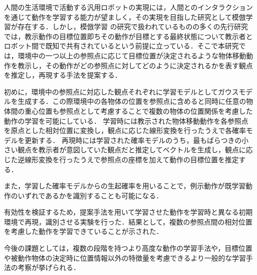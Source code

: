 ﻿人間の生活環境で活動する汎用ロボットの実現には，人間とのインタラクションを通じて動作を学習する能力が望ましく，その実現を目指した研究として模倣学習が存在する．しかし，模倣学習
の研究で扱われているものの多くの先行研究では，教示動作の目標位置即ちその動作が目標とする最終状態について教示者とロボット間で既知で共有されているという前提に立っている．そこで本研究では，環境中の一つ以上の参照点に応じて目標位置が決定されるような物体移動動作を教示し，その動作がどの参照点に対してどのように決定されるかを表す観点を推定し，再現する手法を提案する．

初めに，環境中の参照点に対応した観点それぞれに学習モデルとしてガウスモデルを生成する．この際環境中の各物体の位置を参照点に含めると同時に任意の物体間の重心位置も参照点として考慮することで複数の物体の位置関係を考慮した動作の学習を可能にしている．
学習時には教示された物体移動動作を各参照点を原点とした相対位置に変換し，観点に応じた線形変換を行ったうえで各確率モデルを更新する．
再現時には学習された確率モデルのうち，最もばらつきの小さい観点を教示者が意図していた観点だと推定してベクトルを生成し，観点に応じた逆線形変換を行ったうえで参照点の座標を加えて動作の目標位置を推定する．

また，学習した確率モデルからの生起確率を用いることで，例示動作が既学習動作のいずれであるかを識別することも可能になる．

有効性を検証するため，提案手法を用いて学習させた動作を学習時と異なる初期環境で再現，識別させる実験を行った．結果として，複数の参照点間の相対位置を考慮した動作を学習できていることが示された．

今後の課題としては，複数の段階を持つより高度な動作の学習手法や，目標位置や被動作物体の決定時に位置情報以外の特徴量を考慮できるより一般的な学習手法の考察が挙げられる．
